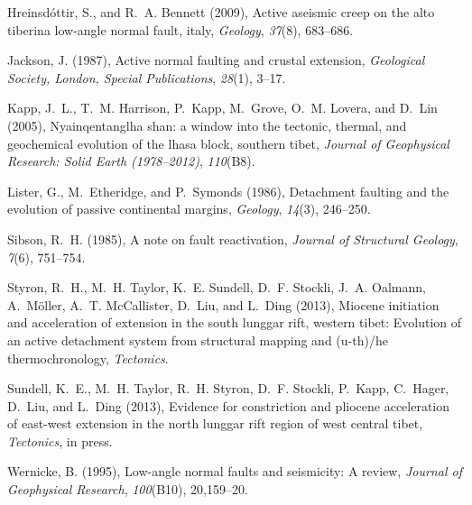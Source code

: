 \documentclass[twocolumn,grl]{AGUTeX}
\begin{document}
\begin{article}
\begin{thebibliography}{23}
Hreinsd{\'o}ttir, S., and R.~A. Bennett (2009), Active aseismic creep on the
  alto tiberina low-angle normal fault, italy, \textit{Geology},
  \textit{37}(8), 683--686.

Jackson, J. (1987), Active normal faulting and crustal extension,
  \textit{Geological Society, London, Special Publications}, \textit{28}(1),
  3--17.

Kapp, J.~L., T.~M. Harrison, P.~Kapp, M.~Grove, O.~M. Lovera, and D.~Lin
  (2005), Nyainqentanglha shan: a window into the tectonic, thermal, and
  geochemical evolution of the lhasa block, southern tibet, \textit{Journal of
  Geophysical Research: Solid Earth (1978--2012)}, \textit{110}(B8).

Lister, G., M.~Etheridge, and P.~Symonds (1986), Detachment faulting and the
  evolution of passive continental margins, \textit{Geology}, \textit{14}(3),
  246--250.

Sibson, R.~H. (1985), A note on fault reactivation, \textit{Journal of
  Structural Geology}, \textit{7}(6), 751--754.

Styron, R.~H., M.~H. Taylor, K.~E. Sundell, D.~F. Stockli, J.~A. Oalmann,
  A.~M{\"o}ller, A.~T. McCallister, D.~Liu, and L.~Ding (2013), Miocene
  initiation and acceleration of extension in the south lunggar rift, western
  tibet: Evolution of an active detachment system from structural mapping and
  (u-th)/he thermochronology, \textit{Tectonics}.

Sundell, K.~E., M.~H. Taylor, R.~H. Styron, D.~F. Stockli, P.~Kapp, C.~Hager,
  D.~Liu, and L.~Ding (2013), Evidence for constriction and pliocene
  acceleration of east-west extension in the north lunggar rift region of west
  central tibet, \textit{Tectonics}, in press.

Wernicke, B. (1995), Low-angle normal faults and seismicity: A review,
  \textit{Journal of Geophysical Research}, \textit{100}(B10), 20,159--20.


\end{thebibliography}
\end{article}
\end{document}
